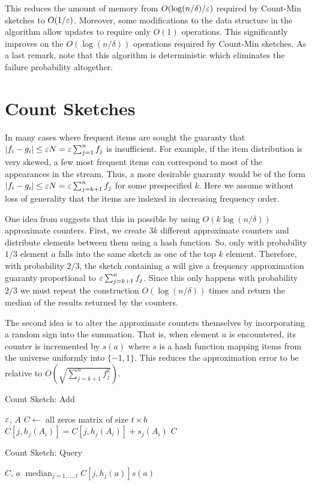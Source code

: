 \documentclass{article}
\begin{document}
This reduces the amount of memory from $O(\log(n/\delta)/\varepsilon)$ required by Count-Min sketches to $O(1/\varepsilon)$.
Moreover, some modifications to the data structure in the algorithm \cite{Karp03asimple} allow updates to require only $O(1)$ operations.
This significantly improves on the $O(\log(n/\delta))$ operations required by Count-Min sketches.
As a last remark, note that this algorithm is deterministic which eliminates the failure probability altogether.

\section{Count Sketches}
In many cases where frequent items are sought the guaranty that $|f_i - g_i| \le \varepsilon N = \varepsilon\sum_{j=1}^{n}f_j$ is insufficient.
For example, if the item distribution is very skewed, a few most frequent items can correspond to most of the appearances in the stream. 
Thus, a more desirable guaranty would be of the form $|f_i - g_i| \le \varepsilon N = \varepsilon\sum_{j=k+1}^{n}f_j$ for some prespecified $k$.
Here we assume without loss of generality that the items are indexed in decreasing frequency order.
  
One idea from \cite{Charikar02findingfrequent} suggests that this in possible by using $O(k \log(n/\delta))$ approximate counters.
First, we create $3k$ different approximate counters and distribute elements between them using a hash function.
So, only with probability $1/3$ element $a$ falls into the same sketch as one of the top $k$ element.
Therefore, with probability $2/3$, the sketch containing  $a$ will give a frequency  approximation guaranty proportional to $\varepsilon \sum_{j=k+1}^{n}f_j$. Since this only happens with probability $2/3$ we must repeat the construction $O(\log(n/\delta))$ times and return the median
of the results returned by the counters.

The second idea is to alter the approximate counters themselves by incorporating a random sign into the summation.
That is, when element $a$ is encountered, its counter is incremented by $s(a)$ where $s$
is a hash function mapping items from the universe uniformly into $\{-1,1\}$.
This reduces the approximation error to be relative to $O(\sqrt{\sum_{j=k+1}^{n}f^2_j})$.

\begin{algorithm}
\caption{Count Sketch: Add}
\label{alg:CountSketchAdd}
\begin{algorithmic}
 $\varepsilon$, $A$ 
\STATE $C \leftarrow$ all zeros matrix of size $t \times b$
		\STATE $C[j,h_j(A_i)] = C[j,h_j(A_i)] + s_j(A_i)$
	\ENDFOR
\ENDFOR
{} $C$ 
\end{algorithmic}
\end{algorithm}
\begin{algorithm}
\caption{Count Sketch: Query}
\label{alg:CountSketchAdd}
\begin{algorithmic}
 $C$, $a$
 $\operatorname{median}_{j =1,\ldots,t} C[j,h_j(a)]s(a)$ 
\end{algorithmic}
\end{algorithm}






\end{document}
